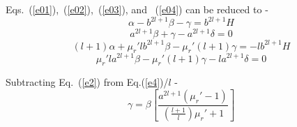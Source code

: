 


Eqs.~(\ref{e01}),~(\ref{e02}),~(\ref{e03}), and ~(\ref{e04}) can be reduced to -
\begin{equation}\label{e1}
\alpha- b^{2l+1}\beta-\gamma=b^{2l+1}H
\end{equation}
\begin{equation}\label{e2}
 a^{2l+1}\beta+\gamma-a^{2l+1}\delta =0
\end{equation}
\begin{equation}\label{e3}
(l+1)\alpha+\mu_r' l b^{2l+1}\beta-\mu_r'(l+1)\gamma=-lb^{2l+1}H
\end{equation}
\begin{equation}\label{e4}
\mu_r'l a^{2l+1}\beta -\mu_r'(l+1)\gamma- l a^{2l+1}\delta=0
\end{equation}

Subtracting Eq.~(\ref{e2}) from Eq.(\ref{e4})/$l$ -
\begin{equation}\label{g1}
\gamma=\beta \left[\frac{a^{2l+1}(\mu_r'-1)}{\left(\frac{l+1}{l}\right)\mu_r'+1}\right]
\end{equation}


